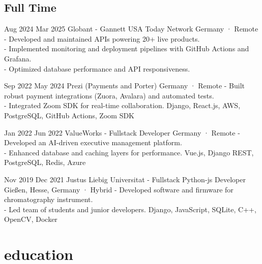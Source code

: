 \documentclass[a4paper,nocolors]{friggeri-cv}
\begin{document}
\subsection{Full Time}

\begin{entrylist}


\entryexperience
{Aug 2024}
{Mar 2025}
{Globant - Gannett USA Today Network }
{Germany · Remote}
{- Developed and maintained APIs powering 20+ live products.\\
- Implemented monitoring and deployment pipelines with GitHub Actions and Grafana.\\
- Optimized database performance and API responsiveness.
}


\entryexperience
{Sep 2022}
{May 2024}
{Prezi (Payments and Porter)}
{Germany · Remote}
{- Built robust payment integrations (Zuora, Avalara) and automated tests.\\
- Integrated Zoom SDK for real-time collaboration.}
{Django, React.js, AWS, PostgreSQL, GitHub Actions, Zoom SDK}


\entryexperience
{Jan 2022}
{Jun 2022}
{ValueWorks - Fullstack Developer}
{Germany · Remote}
{- Developed an AI-driven executive management platform.\\
- Enhanced database and caching layers for performance.}
{Vue.js, Django REST, PostgreSQL, Redis, Azure}

\entryexperience
{Nov 2019}
{Dec 2021}
{Justus Liebig Universitat - Fullstack Python-js Developer}
{Gießen, Hesse, Germany · Hybrid}
{- Developed software and firmware for chromatography instrument.\\
- Led team of students and junior developers.}
{Django, JavaScript, SQLite, C++, OpenCV, Docker}

\end{entrylist}


\section{education}
\end{document}
